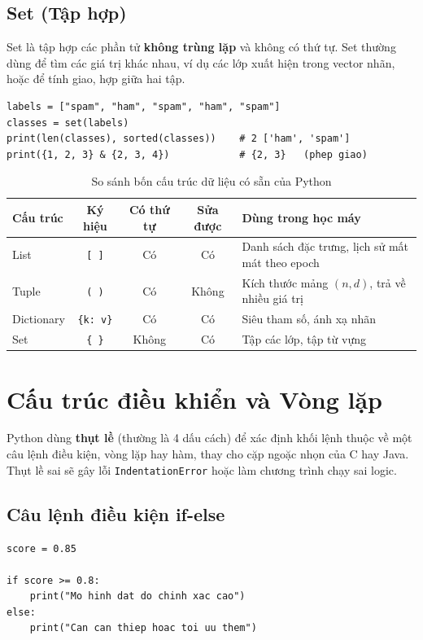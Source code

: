 \subsection{Set (Tập hợp)}
Set là tập hợp các phần tử \textbf{không trùng lặp} và không có thứ tự. Set thường dùng để tìm các giá trị khác nhau, ví dụ các lớp xuất hiện trong vector nhãn, hoặc để tính giao, hợp giữa hai tập.

\begin{lstlisting}[caption={Tìm các giá trị khác nhau bằng Set}]
labels = ["spam", "ham", "spam", "ham", "spam"]
classes = set(labels)
print(len(classes), sorted(classes))    # 2 ['ham', 'spam']
print({1, 2, 3} & {2, 3, 4})            # {2, 3}   (phep giao)
\end{lstlisting}

\begin{table}[H]
\centering
\begin{tabular}{|l|c|c|c|p{5.1cm}|}
\hline
\textbf{Cấu trúc} & \textbf{Ký hiệu} & \textbf{Có thứ tự} & \textbf{Sửa được} & \textbf{Dùng trong học máy} \\
\hline
List & \texttt{[ ]} & Có & Có & Danh sách đặc trưng, lịch sử mất mát theo epoch \\
\hline
Tuple & \texttt{( )} & Có & Không & Kích thước mảng $(n, d)$, trả về nhiều giá trị \\
\hline
Dictionary & \texttt{\{k: v\}} & Có\footnotemark & Có & Siêu tham số, ánh xạ nhãn \\
\hline
Set & \texttt{\{ \}} & Không & Có & Tập các lớp, tập từ vựng \\
\hline
\end{tabular}
\caption{So sánh bốn cấu trúc dữ liệu có sẵn của Python}
\label{tab:python-collections}
\end{table}

\section{Cấu trúc điều khiển và Vòng lặp}
\label{sec:control-flow}

Python dùng \textbf{thụt lề} (thường là 4 dấu cách) để xác định khối lệnh thuộc về một câu lệnh điều kiện, vòng lặp hay hàm, thay cho cặp ngoặc nhọn của C hay Java. Thụt lề sai sẽ gây lỗi \texttt{IndentationError} hoặc làm chương trình chạy sai logic.

\subsection{Câu lệnh điều kiện if-else}
\begin{lstlisting}[caption={Sử dụng cấu trúc điều kiện}]
score = 0.85

if score >= 0.8:
    print("Mo hinh dat do chinh xac cao")
else:
    print("Can can thiep hoac toi uu them")
\end{lstlisting}

